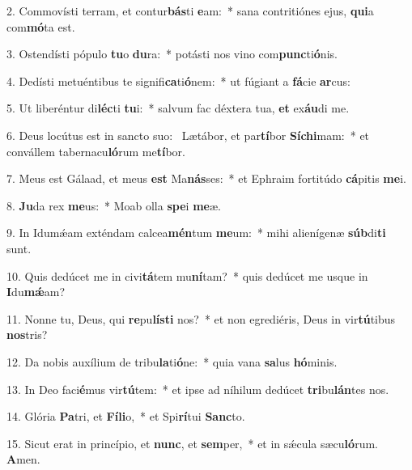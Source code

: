 2. Commovísti terram, et contur\textbf{bás}ti \textbf{e}am:~*  sana contritiónes ejus, \textbf{qui}a com\textbf{mó}ta est.\

3. Ostendísti pópulo \textbf{tu}o \textbf{du}ra:~*  potásti nos vino com\textbf{punc}ti\textbf{ó}nis.\

4. Dedísti metuéntibus te signifi\textbf{ca}ti\textbf{ó}nem:~*  ut fúgiant a \textbf{fá}cie \textbf{ar}cus:\

5. Ut liberéntur di\textbf{léc}ti \textbf{tu}i:~*  salvum fac déxtera tua, \textbf{et} ex\textbf{áu}di me.\

6. Deus locútus est in sancto suo: \dag\  Lætábor, et par\textbf{tí}bor \textbf{Sí}\textbf{chi}mam:~*  et convállem tabernacu\textbf{ló}rum me\textbf{tí}bor.\

7. Meus est Gálaad, et meus \textbf{est} Ma\textbf{nás}ses:~*  et Ephraim fortitúdo \textbf{cá}pitis \textbf{me}i.\

8. \textbf{Ju}da rex \textbf{me}us:~*  Moab olla \textbf{spe}i \textbf{me}æ.\

9. In Idumǽam exténdam calcea\textbf{mén}tum \textbf{me}um:~*  mihi alienígenæ \textbf{súb}di\textbf{ti} sunt.\

10. Quis dedúcet me in civi\textbf{tá}tem mu\textbf{ní}tam?~*  quis dedúcet me usque in \textbf{I}du\textbf{mǽ}am?\

11. Nonne tu, Deus, qui \textbf{re}pu\textbf{lís}\textbf{ti} nos?~*  et non egrediéris, Deus in vir\textbf{tú}tibus \textbf{nos}tris?\

12. Da nobis auxílium de tribu\textbf{la}ti\textbf{ó}ne:~*  quia vana \textbf{sa}lus \textbf{hó}minis.\

13. In Deo faci\textbf{é}mus vir\textbf{tú}tem:~*  et ipse ad níhilum dedúcet \textbf{tri}bu\textbf{lán}tes nos.\

14. Glória \textbf{Pa}tri, et \textbf{Fí}\textbf{li}o,~*  et Spi\textbf{rí}tui \textbf{Sanc}to.\

15. Sicut erat in princípio, et \textbf{nunc}, et \textbf{sem}per,~*  et in sǽcula sæcu\textbf{ló}rum. \textbf{A}men.\

